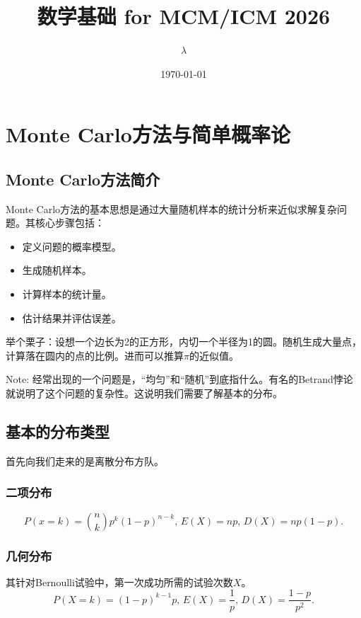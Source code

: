 \documentclass[a4paper, 12pt]{article}
\begin{document}
	
	\title{数学基础 for MCM/ICM 2026}
	\author{$\lambda$}
	\date{\today}
	\maketitle

    \section{Monte Carlo方法与简单概率论}

    \subsection{Monte Carlo方法简介}

    Monte Carlo方法的基本思想是通过大量随机样本的统计分析来近似求解复杂问题。其核心步骤包括：
    \begin{itemize}
        \item 定义问题的概率模型。
        \item 生成随机样本。
        \item 计算样本的统计量。
        \item 估计结果并评估误差。
    \end{itemize}
    举个栗子：设想一个边长为2的正方形，内切一个半径为1的圆。随机生成大量点，计算落在圆内的点的比例。进而可以推算$\pi$的近似值。

    Note: 经常出现的一个问题是，“均匀”和“随机”到底指什么。有名的Betrand悖论就说明了这个问题的复杂性。这说明我们需要了解基本的分布。

    \subsection{基本的分布类型}
    
    首先向我们走来的是离散分布方队。

    \subsubsection{二项分布}
    \[
    P(x=k)=\binom{n}{k}p^k(1-p)^{n-k},\,E(X)=np,\,D(X)=np(1-p).
    \]

    \subsubsection{几何分布}
    其针对Bernoulli试验中，第一次成功所需的试验次数$X$。
    \[
    P(X=k) = (1-p)^{k-1}p,\,E(X)=\frac{1}{p},\,D(X)=\frac{1-p}{p^2}.
    \]
\end{document}
